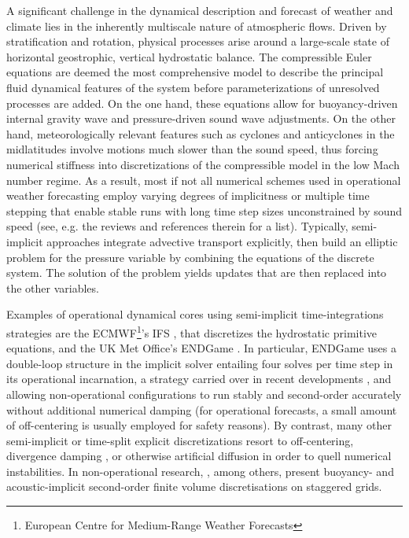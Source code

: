 \documentclass{ametsoc}
\theoremstyle{definition}
\begin{document}
A significant challenge in the dynamical description and forecast of weather and climate lies in the inherently multiscale nature of atmospheric flows. Driven by stratification and rotation, physical processes arise around a large-scale state of horizontal geostrophic, vertical hydrostatic balance. The compressible Euler equations are deemed the most comprehensive model to describe the principal fluid dynamical features of the system before parameterizations of unresolved processes are added. On the one hand, these equations allow for buoyancy-driven internal gravity wave and pressure-driven sound wave adjustments.  On the other hand, meteorologically relevant features such as cyclones and anticyclones in the midlatitudes involve motions much slower than the sound speed, thus forcing numerical stiffness into discretizations of the compressible model in the low Mach number regime. As a result, most if not all numerical schemes used in operational weather forecasting employ varying degrees of implicitness or multiple time stepping that enable stable runs with long time step sizes unconstrained by sound speed (see, e.g. the reviews \cite{MarrasEtAl2016, MengaldoEtAl2018} and references therein for a list). Typically, semi-implicit approaches integrate advective transport explicitly, then build an elliptic problem for the pressure variable by combining the equations of the discrete system. The solution of the problem yields updates that are then replaced into the other variables. 

Examples of operational dynamical cores using semi-implicit time-integrations strategies are the ECMWF\footnote{European Centre for Medium-Range Weather Forecasts}'s IFS \citep{Hortal2002}, that discretizes the hydrostatic primitive equations, and the UK Met Office's ENDGame \citep{WoodEtAl2013, BenacchioWood2016}. In particular, ENDGame  uses a double-loop structure in the implicit solver entailing four solves per time step in its operational incarnation, a strategy carried over in recent developments \citep{MelvinEtAl2018}, and allowing non-operational configurations to run stably and second-order accurately without additional numerical damping (for operational forecasts, a small amount of off-centering is usually employed for safety reasons). By contrast, many other semi-implicit or time-split explicit discretizations resort to off-centering, divergence damping \citep{BryanFritsch2002}, or otherwise artificial diffusion in order to quell numerical instabilities. In non-operational research, \cite{DumbserEtAl2018}, among others, present buoyancy- and acoustic-implicit second-order finite volume discretisations on staggered grids.
\end{document}
